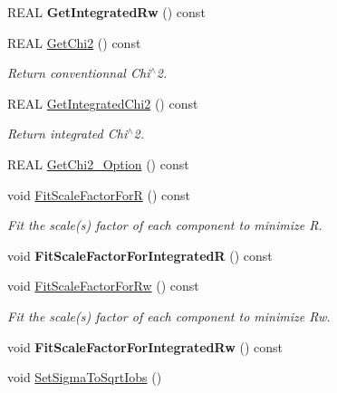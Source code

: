 \begin{DoxyCompactItemize}
R\+E\+AL {\bfseries Get\+Integrated\+Rw} () const
\item 
R\+E\+AL \mbox{\hyperlink{class_obj_cryst_1_1_powder_pattern_ab9fae16effd2ca4b59bf40e0706b86f2}{Get\+Chi2}} () const
\begin{DoxyCompactList}\small\item\em Return conventionnal Chi$^\wedge$2. \end{DoxyCompactList}\item 
R\+E\+AL \mbox{\hyperlink{class_obj_cryst_1_1_powder_pattern_a12ffd532da8462d03b56cc8e2be210ba}{Get\+Integrated\+Chi2}} () const
\begin{DoxyCompactList}\small\item\em Return integrated Chi$^\wedge$2. \end{DoxyCompactList}\item 
R\+E\+AL \mbox{\hyperlink{class_obj_cryst_1_1_powder_pattern_ae76721ca73e29a776de4b20fc23514a6}{Get\+Chi2\+\_\+\+Option}} () const
\item 
void \mbox{\hyperlink{class_obj_cryst_1_1_powder_pattern_add7e991dc93dcd85df4fc41fc2e7fc37}{Fit\+Scale\+Factor\+ForR}} () const
\begin{DoxyCompactList}\small\item\em Fit the scale(s) factor of each component to minimize R. \end{DoxyCompactList}\item 
\mbox{\label{class_obj_cryst_1_1_powder_pattern_a5f2bcf98d3b6f26628f3af439ebb27f3}} 
void {\bfseries Fit\+Scale\+Factor\+For\+IntegratedR} () const
\item 
void \mbox{\hyperlink{class_obj_cryst_1_1_powder_pattern_ab9b4d9f2af1885625fb27c6b1ab7519d}{Fit\+Scale\+Factor\+For\+Rw}} () const
\begin{DoxyCompactList}\small\item\em Fit the scale(s) factor of each component to minimize Rw. \end{DoxyCompactList}\item 
\mbox{\label{class_obj_cryst_1_1_powder_pattern_af45d09d44fb987434b0854ce614c3e56}} 
void {\bfseries Fit\+Scale\+Factor\+For\+Integrated\+Rw} () const
\item 
\mbox{\label{class_obj_cryst_1_1_powder_pattern_a1f2397ca48de524cb3916103eb83a267}} 
void \mbox{\hyperlink{class_obj_cryst_1_1_powder_pattern_a1f2397ca48de524cb3916103eb83a267}{Set\+Sigma\+To\+Sqrt\+Iobs}} ()

\end{DoxyCompactItemize}
